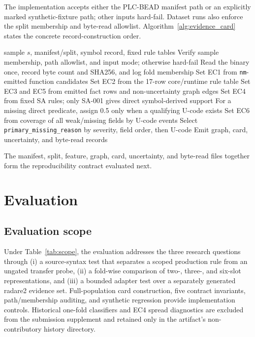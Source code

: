 \documentclass[manuscript,screen,review]{acmart}
\begin{document}
The implementation accepts either the PLC-BEAD manifest path or an explicitly marked synthetic-fixture path; other inputs hard-fail. Dataset runs also enforce the split membership and byte-read allowlist. Algorithm~\ref{alg:evidence_card} states the concrete record-construction order.

\begin{algorithm}[tbp]
\caption{Evidence-card construction}
\label{alg:evidence_card}
\begin{algorithmic}[1]
\Require sample $s$, manifest/split, symbol record, fixed rule tables
\State Verify sample membership, path allowlist, and input mode; otherwise hard-fail
\State Read the binary once, record byte count and SHA256, and log fold membership
\State Set EC1 from \texttt{nm}-emitted function candidates
\State Set EC2 from the 17-row core/runtime rule table
\State Set EC3 and EC5 from emitted fact rows and non-uncertainty graph edges
\State Set EC4 from fixed SA rules; only SA-001 gives direct symbol-derived support
\State For a missing direct predicate, assign 0.5 only when a qualifying U-code exists
\State Set EC6 from coverage of all weak/missing fields by U-code events
\State Select \texttt{primary\_missing\_reason} by severity, field order, then U-code
\State Emit graph, card, uncertainty, and byte-read records
\end{algorithmic}
\end{algorithm}

The manifest, split, feature, graph, card, uncertainty, and byte-read files together form the reproducibility contract evaluated next.



\section{Evaluation}

\subsection{Evaluation scope}

Under Table~\ref{tab:scope}, the evaluation addresses the three research questions through (i) a source-syntax test that separates a scoped production rule from an ungated transfer probe, (ii) a fold-wise comparison of two-, three-, and six-slot representations, and (iii) a bounded adapter test over a separately generated radare2 evidence set. Full-population card construction, five contract invariants, path/membership auditing, and synthetic regression provide implementation controls. Historical one-fold classifiers and EC4 spread diagnostics are excluded from the submission supplement and retained only in the artifact's non-contributory history directory.
\end{document}
